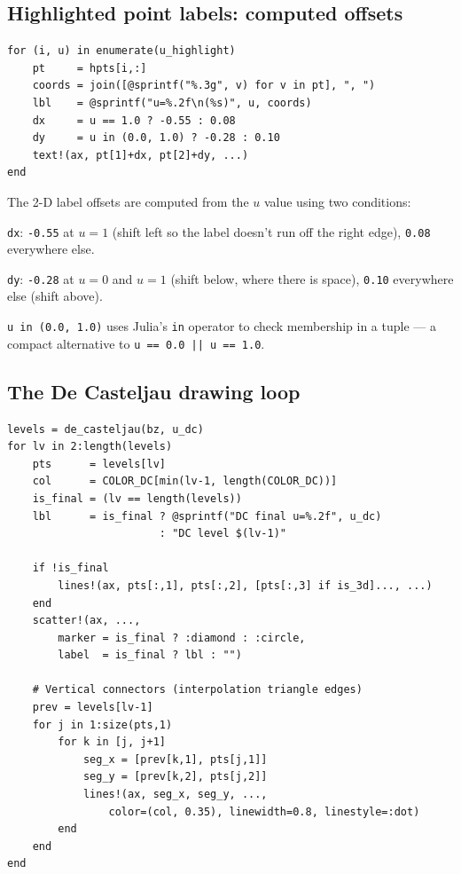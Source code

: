 \documentclass[12pt, a4paper]{article}
\newcommand{\cd}[1]{\texttt{#1}}
\begin{document}
\subsection{Highlighted point labels: computed offsets}

\begin{verbatim}
for (i, u) in enumerate(u_highlight)
    pt     = hpts[i,:]
    coords = join([@sprintf("%.3g", v) for v in pt], ", ")
    lbl    = @sprintf("u=%.2f\n(%s)", u, coords)
    dx     = u == 1.0 ? -0.55 : 0.08
    dy     = u in (0.0, 1.0) ? -0.28 : 0.10
    text!(ax, pt[1]+dx, pt[2]+dy, ...)
end
\end{verbatim}

The 2-D label offsets are computed from the $u$ value
using two conditions:

\cd{dx}: \cd{-0.55} at $u=1$ (shift left so the label
doesn't run off the right edge), \cd{0.08} everywhere else.

\cd{dy}: \cd{-0.28} at $u=0$ and $u=1$ (shift below,
where there is space), \cd{0.10} everywhere else
(shift above).

\cd{u in (0.0, 1.0)} uses Julia's \cd{in} operator to
check membership in a tuple --- a compact alternative
to \cd{u == 0.0 || u == 1.0}.

\subsection{The De Casteljau drawing loop}

\begin{verbatim}
levels = de_casteljau(bz, u_dc)
for lv in 2:length(levels)
    pts      = levels[lv]
    col      = COLOR_DC[min(lv-1, length(COLOR_DC))]
    is_final = (lv == length(levels))
    lbl      = is_final ? @sprintf("DC final u=%.2f", u_dc)
                        : "DC level $(lv-1)"

    if !is_final
        lines!(ax, pts[:,1], pts[:,2], [pts[:,3] if is_3d]..., ...)
    end
    scatter!(ax, ...,
        marker = is_final ? :diamond : :circle,
        label  = is_final ? lbl : "")

    # Vertical connectors (interpolation triangle edges)
    prev = levels[lv-1]
    for j in 1:size(pts,1)
        for k in [j, j+1]
            seg_x = [prev[k,1], pts[j,1]]
            seg_y = [prev[k,2], pts[j,2]]
            lines!(ax, seg_x, seg_y, ...,
                color=(col, 0.35), linewidth=0.8, linestyle=:dot)
        end
    end
end
\end{verbatim}
\end{document}
